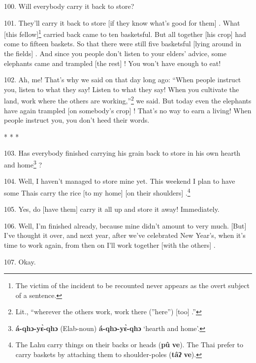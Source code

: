 100. Will everybody carry it back to store?

101. They'll carry it back to store [if they know what's good for them] . What
[this fellow]\footnote{The victim of the incident to be recounted never appears as the overt subject of a sentence.} carried back came to ten basketsful. But all together [his
crop] had come to fifteen baskets. So that there were still five basketsful [lying
around in the fields] . And since you people don't listen to your elders' advice,
some elephants came and trampled [the rest] ! You won't have enough to eat!

102. Ah, me! That's why we said on that day long ago: ``When people instruct
you, listen to what they say! Listen to what they say! When you cultivate the land,
work where the others are working,''\footnote{Lit., ``wherever the others work, work there (''here'') [too] .''} we said. But today even the elephants
have again trampled [on somebody's crop] ! That's no way to earn a living! When
people instruct you, you don't heed their words.

\begin{center}
* * *
\end{center}

103. Has everybody finished carrying his grain back to store in his own hearth
and home\footnote{\textbf{á-qhɔ-yɛ̀-qhɔ} (Elab-noun) \textbf{á-qhɔ-yɛ̀-qhɔ} `hearth and home'.} ?

104. Well, I haven't managed to store mine yet. This weekend I plan to have some
Thais carry the rice [to my home] [on their shoulders] .\footnote{The Lahu carry things on their backs or heads (\textbf{pû} \textbf{ve}). The Thai prefer to carry baskets by attaching them to shoulder-poles (\textbf{tâʔ} \textbf{ve}).}

105. Yes, do [have them] carry it all up and store it away! Immediately.

106. Well, I'm finished already, because mine didn't amount to very much. [But]
I've thought it over, and next year, after we've celebrated New Year's, when it's
time to work again, from then on I'll work together [with the others] .

107. Okay.

